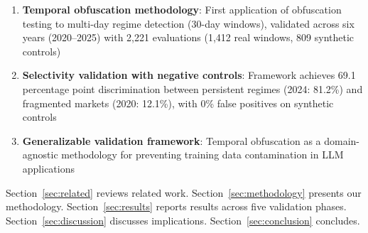 \begin{enumerate}
\item \textbf{Temporal obfuscation methodology}: First application of obfuscation testing to multi-day regime detection (30-day windows), validated across six years (2020--2025) with 2,221 evaluations (1,412 real windows, 809 synthetic controls)
\item \textbf{Selectivity validation with negative controls}: Framework achieves 69.1 percentage point discrimination between persistent regimes (2024: 81.2\%) and fragmented markets (2020: 12.1\%), with 0\% false positives on synthetic controls
\item \textbf{Generalizable validation framework}: Temporal obfuscation as a domain-agnostic methodology for preventing training data contamination in LLM applications
\end{enumerate}

Section~\ref{sec:related} reviews related work. Section~\ref{sec:methodology} presents our methodology. Section~\ref{sec:results} reports results across five validation phases. Section~\ref{sec:discussion} discusses implications. Section~\ref{sec:conclusion} concludes.
